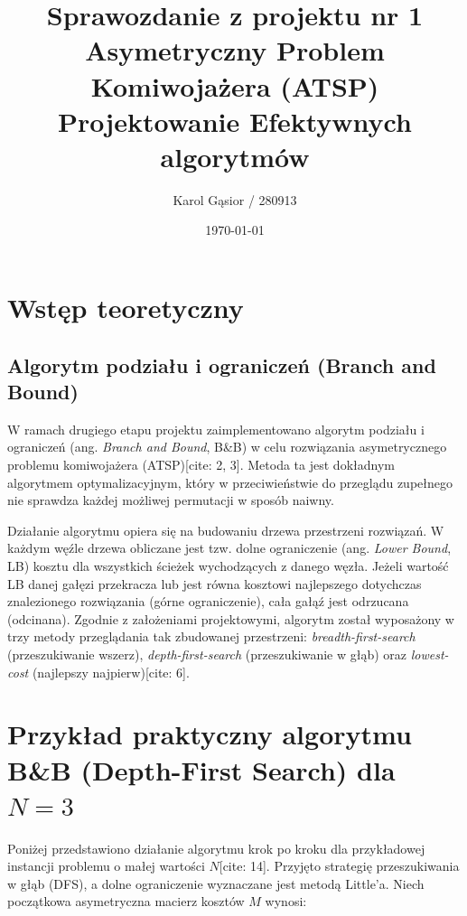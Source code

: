 \documentclass[12pt, a4paper]{article}
\title{\textbf{Sprawozdanie z projektu nr 1} \\ \large Asymetryczny Problem Komiwojażera (ATSP)
\\ \large Projektowanie Efektywnych algorytmów}
\author{Karol Gąsior / 280913}
\date{\today}
\begin{document}
	
	\maketitle %
	\newpage
	\tableofcontents %
	\newpage
	
\section{Wstęp teoretyczny}

\subsection{Algorytm podziału i ograniczeń (Branch and Bound)}
W ramach drugiego etapu projektu zaimplementowano algorytm podziału i ograniczeń (ang. \textit{Branch and Bound}, B\&B) w celu rozwiązania asymetrycznego problemu komiwojażera (ATSP)[cite: 2, 3]. Metoda ta jest dokładnym algorytmem optymalizacyjnym, który w przeciwieństwie do przeglądu zupełnego nie sprawdza każdej możliwej permutacji w sposób naiwny. 

Działanie algorytmu opiera się na budowaniu drzewa przestrzeni rozwiązań. W każdym węźle drzewa obliczane jest tzw. dolne ograniczenie (ang. \textit{Lower Bound}, LB) kosztu dla wszystkich ścieżek wychodzących z danego węzła. Jeżeli wartość LB danej gałęzi przekracza lub jest równa kosztowi najlepszego dotychczas znalezionego rozwiązania (górne ograniczenie), cała gałąź jest odrzucana (odcinana). Zgodnie z założeniami projektowymi, algorytm został wyposażony w trzy metody przeglądania tak zbudowanej przestrzeni: \textit{breadth-first-search} (przeszukiwanie wszerz), \textit{depth-first-search} (przeszukiwanie w głąb) oraz \textit{lowest-cost} (najlepszy najpierw)[cite: 6].


\section{Przykład praktyczny algorytmu B\&B (Depth-First Search) dla $N=3$}

Poniżej przedstawiono działanie algorytmu krok po kroku dla przykładowej instancji problemu o małej wartości $N$[cite: 14]. Przyjęto strategię przeszukiwania w głąb (DFS), a dolne ograniczenie wyznaczane jest metodą Little'a. Niech początkowa asymetryczna macierz kosztów $M$ wynosi:
\end{document}
